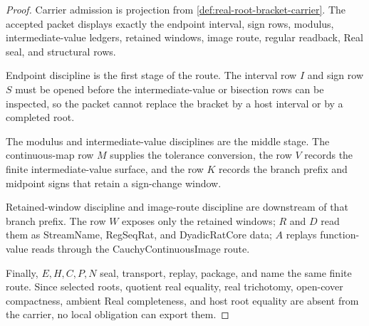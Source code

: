\begin{proof}
Carrier admission is projection from \autoref{def:real-root-bracket-carrier}. The accepted packet displays exactly the endpoint interval, sign rows, modulus, intermediate-value ledgers, retained windows, image route, regular readback, Real seal, and structural rows.

Endpoint discipline is the first stage of the route. The interval row $I$ and sign row $S$ must be opened before the intermediate-value or bisection rows can be inspected, so the packet cannot replace the bracket by a host interval or by a completed root.

The modulus and intermediate-value disciplines are the middle stage. The continuous-map row $M$ supplies the tolerance conversion, the row $V$ records the finite intermediate-value surface, and the row $K$ records the branch prefix and midpoint signs that retain a sign-change window.

Retained-window discipline and image-route discipline are downstream of that branch prefix. The row $W$ exposes only the retained windows; $R$ and $D$ read them as StreamName, RegSeqRat, and DyadicRatCore data; $A$ replays function-value reads through the CauchyContinuousImage route.

Finally, $E,H,C,P,N$ seal, transport, replay, package, and name the same finite route. Since selected roots, quotient real equality, real trichotomy, open-cover compactness, ambient Real completeness, and host root equality are absent from the carrier, no local obligation can export them.
\end{proof}

